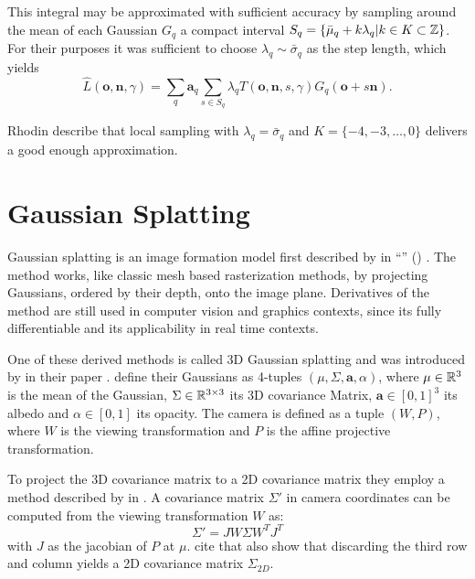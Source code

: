 \documentclass[a4paper, 11pt]{memoir}
\begin{document}
    This integral may be approximated with sufficient accuracy by sampling around the mean of each Gaussian $G_q$
    a compact interval $S_q = \{ \bar{\mu}_q + k\lambda_q | k \in K \subset \mathbb{Z} \}$. For their purposes it was sufficient
    to choose $\lambda_q \sim \bar{\sigma}_q$ as the step length, which yields
    \begin{equation}
        \hat{L}(\mathbf{o}, \mathbf{n}, \gamma) = \sum_q \mathbf{a}_q \sum_{s \in S_q}
            \lambda_q T(\mathbf{o}, \mathbf{n}, s, \gamma)G_q(\mathbf{o} + s\mathbf{n}).
        \label{eq:radiance}
    \end{equation}

    Rhodin \etal describe that local sampling with $\lambda_q = \bar{\sigma}_q$ and
    $K = \{ -4, -3, \dots, 0 \}$ delivers a good enough approximation.

    \section{Gaussian Splatting}
    Gaussian splatting is an image formation model first described by \citeauthor{splatting} in \enquote{}
    (\citeyear{splatting}) \cite{splatting}. The method works, like classic mesh based rasterization methods, by projecting
    Gaussians, ordered by their depth, onto the image plane. Derivatives of the method are still used in computer vision and graphics
    contexts, since its fully differentiable and its applicability in real time contexts.

    One of these derived methods is called 3D Gaussian splatting and was introduced by \citeauthor{kerbl3Dgaussians} in their
    \citeyear{kerbl3Dgaussians} paper \cite{kerbl3Dgaussians}. \citeauthor{splatting} define their Gaussians
    as 4-tuples $(\mu, \Sigma, \mathbf{a}, \alpha)$, where $\mu \in \mathbb{R}^3$ is the mean of the Gaussian, $\Sigma \in \mathbb{R}^{3\times 3}$
    its 3D covariance Matrix, $\mathbf{a} \in [0, 1]^3$ its albedo and $\alpha \in [0, 1]$ its opacity. The camera is defined as a tuple
    $(W, P)$, where $W$ is the viewing transformation and $P$ is the affine projective transformation.

    To project the 3D covariance matrix to a 2D covariance matrix they employ a method described by \citeauthor{volume_splatting}
    in \cite{volume_splatting}. A covariance matrix $\Sigma'$ in camera coordinates can be computed
    from the viewing transformation $W$ as:
    \begin{equation}
        \Sigma' = JW\Sigma W^TJ^T
    \end{equation}
    with $J$ as the jacobian of $P$ at $\mu$. \citeauthor{kerbl3Dgaussians} cite that \citeauthor{volume_splatting} also show that discarding the third row and column yields
    a 2D covariance matrix $\Sigma_{2D}$.
\end{document}

